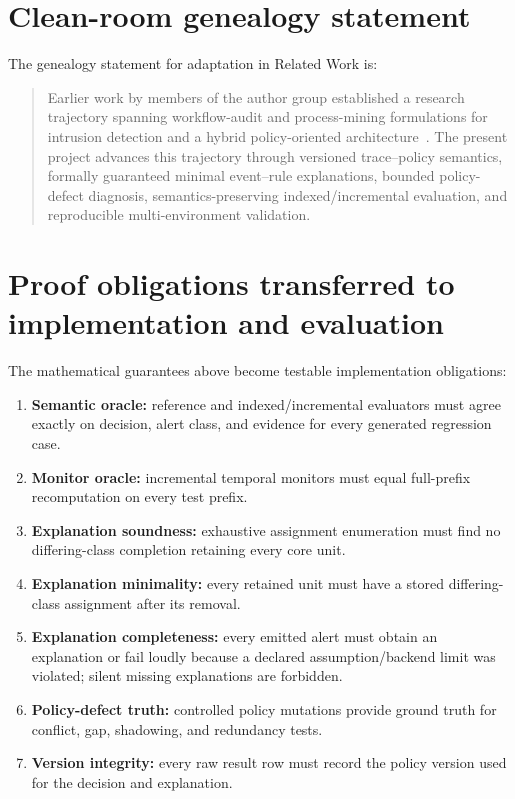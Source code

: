 \documentclass[11pt]{article}
\theoremstyle{remark}
\begin{document}
\section{Clean-room genealogy statement}

The genealogy statement for adaptation in Related Work is:

\begin{quote}
Earlier work by members of the author group established a research trajectory spanning workflow-audit and process-mining formulations for intrusion detection and a hybrid policy-oriented architecture~\citep{Roger2013_r64,Nicolas2019_r65,Nicolas2022_r66,Nicolas2026_r67}. The present project advances this trajectory through versioned trace--policy semantics, formally guaranteed minimal event--rule explanations, bounded policy-defect diagnosis, semantics-preserving indexed/incremental evaluation, and reproducible multi-environment validation.
\end{quote}

\section{Proof obligations transferred to implementation and evaluation}

The mathematical guarantees above become testable implementation obligations:
\begin{enumerate}
\item \textbf{Semantic oracle:} reference and indexed/incremental evaluators must agree exactly on decision, alert class, and evidence for every generated regression case.
\item \textbf{Monitor oracle:} incremental temporal monitors must equal full-prefix recomputation on every test prefix.
\item \textbf{Explanation soundness:} exhaustive assignment enumeration must find no differing-class completion retaining every core unit.
\item \textbf{Explanation minimality:} every retained unit must have a stored differing-class assignment after its removal.
\item \textbf{Explanation completeness:} every emitted alert must obtain an explanation or fail loudly because a declared assumption/backend limit was violated; silent missing explanations are forbidden.
\item \textbf{Policy-defect truth:} controlled policy mutations provide ground truth for conflict, gap, shadowing, and redundancy tests.
\item \textbf{Version integrity:} every raw result row must record the policy version used for the decision and explanation.
\end{enumerate}
\end{document}
